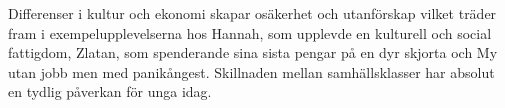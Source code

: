 Differenser i kultur och ekonomi skapar osäkerhet och utanförskap vilket träder fram i exempelupplevelserna hos Hannah, som upplevde en kulturell och social fattigdom, Zlatan, som spenderande sina sista pengar på en dyr skjorta och My utan jobb men med panikångest. Skillnaden mellan samhällsklasser har absolut en tydlig påverkan för unga idag.






